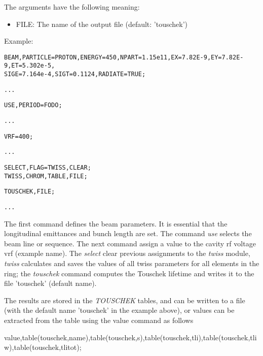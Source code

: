 The arguments have the following meaning: 
\begin{itemize}
	\item FILE: The name of the output file (default: 'touschek') 
   
\end{itemize}

Example: 
\begin{verbatim}
BEAM,PARTICLE=PROTON,ENERGY=450,NPART=1.15e11,EX=7.82E-9,EY=7.82E-9,ET=5.302e-5,
SIGE=7.164e-4,SIGT=0.1124,RADIATE=TRUE;
\end{verbatim}
\begin{verbatim}
...
\end{verbatim}
\begin{verbatim}
USE,PERIOD=FODO;	
\end{verbatim}
\begin{verbatim}
... 	
\end{verbatim}
\begin{verbatim}
VRF=400;
\end{verbatim}
\begin{verbatim}
...
\end{verbatim}
\begin{verbatim}
SELECT,FLAG=TWISS,CLEAR;
TWISS,CHROM,TABLE,FILE;
\end{verbatim}
\begin{verbatim}
TOUSCHEK,FILE;
\end{verbatim}
\begin{verbatim}
...
\end{verbatim}

 
 The first command defines the beam parameters. It is essential that the 
 longitudinal emittances and bunch length are set. The command \textit{use} selects the beam 
 line or sequence. The next command assign a value to the cavity rf voltage vrf 
 (example name). The \textit{select} clear previous assignments to the \textit{twiss }module,
 \textit{twiss 
 }calculates and saves the values of all twiss parameters for all elements in 
 the ring; the \textit{touschek} command computes the Touschek lifetime and writes 
 it to the file 'touschek' (default name). 
 

The results are stored in the \textit{TOUSCHEK }tables, and can be written to a 
 file (with the default name 'touschek' in the example above), or values can be 
 extracted from the table using the value command as follows 

value,table(touschek,name),table(touschek,s),table(touschek,tli),table(touschek,tliw),table(touschek,tlitot); 

